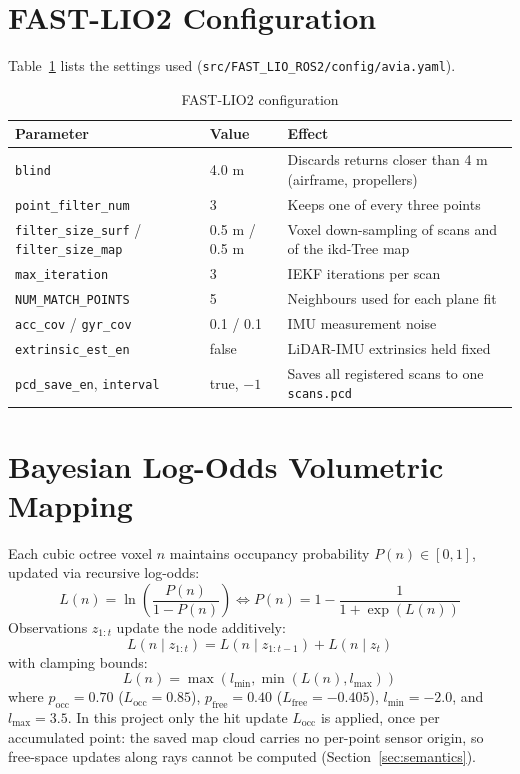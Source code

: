 \documentclass[11pt,a4paper]{report}
\begin{document}
\section{FAST-LIO2 Configuration}
Table~\ref{tab:fastlio_cfg} lists the settings used (\texttt{src/FAST\_LIO\_ROS2/config/avia.yaml}).
\begin{table}[H]
    \centering
    \caption{FAST-LIO2 configuration}
    \label{tab:fastlio_cfg}
    \vspace{2mm}
    \begin{tabular}{lll}
        \toprule
        \textbf{Parameter} & \textbf{Value} & \textbf{Effect} \\
        \midrule
        \texttt{blind} & 4.0 m & Discards returns closer than 4 m (airframe, propellers) \\
        \texttt{point\_filter\_num} & 3 & Keeps one of every three points \\
        \texttt{filter\_size\_surf} / \texttt{filter\_size\_map} & 0.5 m / 0.5 m & Voxel down-sampling of scans and of the ikd-Tree map \\
        \texttt{max\_iteration} & 3 & IEKF iterations per scan \\
        \texttt{NUM\_MATCH\_POINTS} & 5 & Neighbours used for each plane fit \\
        \texttt{acc\_cov} / \texttt{gyr\_cov} & 0.1 / 0.1 & IMU measurement noise \\
        \texttt{extrinsic\_est\_en} & false & LiDAR-IMU extrinsics held fixed \\
        \texttt{pcd\_save\_en}, \texttt{interval} & true, $-1$ & Saves all registered scans to one \texttt{scans.pcd} \\
        \bottomrule
    \end{tabular}
\end{table}

\section{Bayesian Log-Odds Volumetric Mapping}
Each cubic octree voxel $n$ maintains occupancy probability $P(n) \in [0, 1]$, updated via recursive log-odds:
\begin{equation}
    L(n) = \ln \left( \frac{P(n)}{1 - P(n)} \right) \iff P(n) = 1 - \frac{1}{1 + \exp(L(n))}
\end{equation}
Observations $z_{1:t}$ update the node additively:
\begin{equation}
    L(n \mid z_{1:t}) = L(n \mid z_{1:t-1}) + L(n \mid z_t)
\end{equation}
with clamping bounds:
\begin{equation}
    L(n) = \max \left( l_{\min}, \min \left( L(n), l_{\max} \right) \right)
\end{equation}
where $p_{\text{occ}} = 0.70$ ($L_{\text{occ}} = 0.85$), $p_{\text{free}} = 0.40$ ($L_{\text{free}} = -0.405$), $l_{\min} = -2.0$, and $l_{\max} = 3.5$. In this project only the hit update $L_{\text{occ}}$ is applied, once per accumulated point: the saved map cloud carries no per-point sensor origin, so free-space updates along rays cannot be computed (Section~\ref{sec:semantics}).
\end{document}
